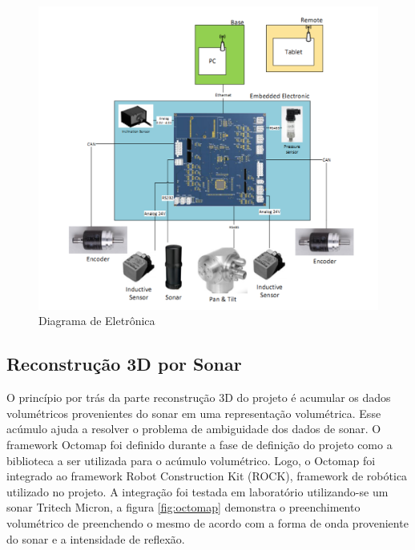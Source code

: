  \begin{figure}[ht!]
    \centering \includegraphics[width=1\columnwidth]{figs/resultados/eletronica}
    \caption{Diagrama de Eletrônica}
    \label{fig:eletronica}
\end{figure}


\noindent
\subsection{Reconstrução 3D por Sonar}

O princípio por trás da parte reconstrução 3D do projeto é  acumular os dados volumétricos provenientes do sonar em uma representação volumétrica. Esse acúmulo ajuda a resolver o problema de ambiguidade dos dados de sonar. O framework Octomap foi definido durante a fase de definição do projeto como a biblioteca a ser utilizada para o acúmulo volumétrico. Logo, o Octomap foi integrado ao framework Robot Construction Kit (ROCK), framework de robótica utilizado no projeto. A integração foi testada em laboratório utilizando-se um sonar Tritech Micron, a figura \ref{fig:octomap} demonstra o preenchimento volumétrico de preenchendo o mesmo de acordo com a forma de onda proveniente do sonar e a intensidade de reflexão. 

